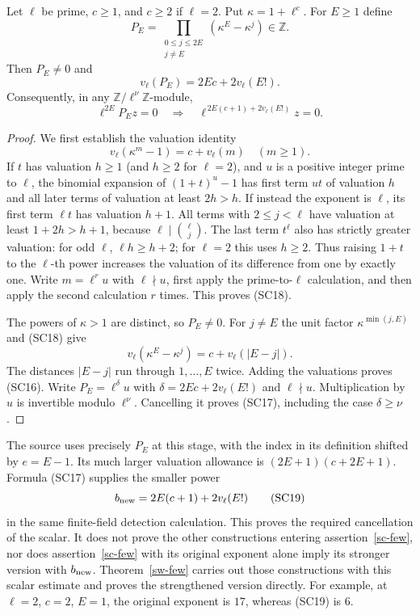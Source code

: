 \begin{lemma}\label{sc-vandermonde}
Let $\ell$ be prime, $c\ge1$, and $c\ge2$ if $\ell=2$.
Put $\kappa=1+\ell^c$.  For $E\ge1$ define
\[
             P_E=\prod_{\substack{0\le j\le2E\\j\ne E}}
                       (\kappa^E-\kappa^j)\in\mathbb Z.
\]
Then $P_E\ne0$ and
\[
                   v_\ell(P_E)=2Ec+2v_\ell(E!).
                   \tag{SC16}
\]
Consequently, in any $\mathbb Z/\ell^\nu\mathbb Z$-module,
\[
           \ell^{2E}P_E z=0
             \quad\Longrightarrow\quad
           \ell^{\,2E(c+1)+2v_\ell(E!)}z=0.
           \tag{SC17}
\]
\end{lemma}
\begin{proof}
We first establish the valuation identity
\[
                   v_\ell(\kappa^m-1)=c+v_\ell(m)
                              \quad(m\ge1).
                   \tag{SC18}
\]
If $t$ has valuation $h\ge1$ (and $h\ge2$ for $\ell=2$),
and $u$ is a positive integer prime to $\ell$, the binomial
expansion of $(1+t)^u-1$ has first term $ut$ of valuation
$h$ and all later terms of valuation at least $2h>h$.
If instead the exponent is $\ell$, its first term
$\ell t$ has valuation $h+1$.  All terms with
$2\le j<\ell$ have valuation at least $1+2h>h+1$,
because $\ell\mid\binom{\ell}{j}$.
The last term $t^\ell$ also has strictly greater valuation:
for odd $\ell$, $\ell h\ge h+2$; for $\ell=2$ this uses
$h\ge2$.  Thus raising $1+t$ to the $\ell$-th power
increases the valuation of its difference from one by
exactly one.  Write $m=\ell^r u$ with $\ell\nmid u$,
first apply the prime-to-$\ell$ calculation, and then
apply the second calculation $r$ times.  This proves
(SC18).

The powers of $\kappa>1$ are distinct, so $P_E\ne0$.
For $j\ne E$ the unit factor
$\kappa^{\min(j,E)}$ and (SC18) give
\[
             v_\ell(\kappa^E-\kappa^j)
                          =c+v_\ell(|E-j|).
\]
The distances $|E-j|$ run through $1,\ldots,E$ twice.
Adding the valuations proves (SC16).
Write $P_E=\ell^\delta u$ with
$\delta=2Ec+2v_\ell(E!)$ and $\ell\nmid u$.
Multiplication by $u$ is invertible modulo $\ell^\nu$.
Cancelling it proves (SC17), including the case
$\delta\ge\nu$.
\end{proof}

The source uses precisely $P_E$ at this stage, with the
index in its definition shifted by $e=E-1$.
Its much larger valuation allowance is
$(2E+1)(c+2E+1)$.  Formula (SC17) supplies the smaller
power
\[
                         b_{\rm new}=2E(c+1)+2v_\ell(E!)
                         \tag{SC19}
\]
in the same finite-field detection calculation.
This proves the required cancellation of the scalar.
It does not prove the other constructions entering
assertion~\ref{sc-few}, nor does assertion~\ref{sc-few}
with its original exponent alone imply its stronger
version with $b_{\rm new}$.  Theorem~\ref{sw-few} carries
out those constructions with this scalar estimate and proves
the strengthened version directly.
For example, at $\ell=2$, $c=2$, $E=1$, the original
exponent is $17$, whereas (SC19) is $6$.

